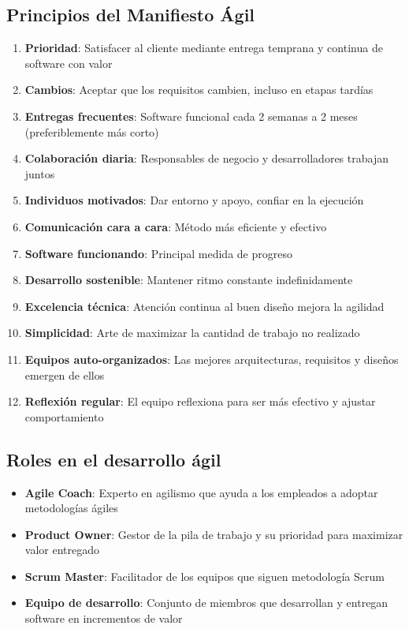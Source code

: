\documentclass[a4paper,11pt]{report}
\begin{document}
\subsection{Principios del Manifiesto Ágil}

\begin{enumerate}
    \item \textbf{Prioridad}: Satisfacer al cliente mediante entrega temprana y continua de software con valor
    \item \textbf{Cambios}: Aceptar que los requisitos cambien, incluso en etapas tardías
    \item \textbf{Entregas frecuentes}: Software funcional cada 2 semanas a 2 meses (preferiblemente más corto)
    \item \textbf{Colaboración diaria}: Responsables de negocio y desarrolladores trabajan juntos
    \item \textbf{Individuos motivados}: Dar entorno y apoyo, confiar en la ejecución
    \item \textbf{Comunicación cara a cara}: Método más eficiente y efectivo
    \item \textbf{Software funcionando}: Principal medida de progreso
    \item \textbf{Desarrollo sostenible}: Mantener ritmo constante indefinidamente
    \item \textbf{Excelencia técnica}: Atención continua al buen diseño mejora la agilidad
    \item \textbf{Simplicidad}: Arte de maximizar la cantidad de trabajo no realizado
    \item \textbf{Equipos auto-organizados}: Las mejores arquitecturas, requisitos y diseños emergen de ellos
    \item \textbf{Reflexión regular}: El equipo reflexiona para ser más efectivo y ajustar comportamiento
\end{enumerate}


\subsection{Roles en el desarrollo ágil}

\begin{itemize}
    \item \textbf{Agile Coach}: Experto en agilismo que ayuda a los empleados a adoptar metodologías ágiles
    \item \textbf{Product Owner}: Gestor de la pila de trabajo y su prioridad para maximizar valor entregado
    \item \textbf{Scrum Master}: Facilitador de los equipos que siguen metodología Scrum
    \item \textbf{Equipo de desarrollo}: Conjunto de miembros que desarrollan y entregan software en incrementos de valor
\end{itemize}
\end{document}
